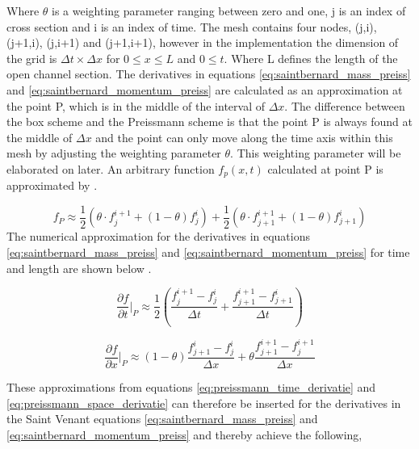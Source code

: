 Where $\theta$ is a weighting parameter ranging between zero and one, j is an index of cross section and i is an index of time. The mesh contains four nodes, (j,i), (j+1,i), (j,i+1) and (j+1,i+1), however in the implementation the dimension of the grid is $\Delta t \times \Delta x$ for $0 \leq x \leq L$ and $0\leq t$. Where L defines the length of the open channel section. The derivatives in equations \ref{eq:saintbernard_mass_preiss} and \ref{eq:saintbernard_momentum_preiss} are calculated as an approximation at the point P, which is in the middle of the interval of $\Delta x$.%
The difference between the box scheme and the Preissmann scheme is that the point P is always found at the middle of $\Delta x$ and the point can only move along the time axis within this mesh by adjusting the weighting parameter $\theta$. This weighting parameter will be elaborated on later. An arbitrary function $f_p(x,t)$ calculated at point P is approximated by \cite{numerical_modeling}.

\begin{equation}\label{eq:approximated_function}
	f_P \approx \frac{1}{2} (\theta \cdot f_j^{i+1}+(1-\theta)f_j^i)+\frac{1}{2}(\theta\cdot f_{j+1}^{i+1}+(1-\theta)f_{j+1}^i)
\end{equation}
The numerical approximation for the derivatives in equations \ref{eq:saintbernard_mass_preiss} and \ref{eq:saintbernard_momentum_preiss} for time and length are shown below \cite{numerical_modeling}.

\begin{equation}\label{eq:preissmann_time_derivatie}
	\frac{\partial f}{\partial t}\bigg \rvert_P \approx \frac{1}{2}\left(\frac{f_j^{i+1}-f_j^i}{\Delta t}+\frac{f_{j+1}^{i+1}-f_{j+1}^i}{\Delta t}\right)
\end{equation}

\begin{equation}\label{eq:preissmann_space_derivatie}
	\frac{\partial f}{\partial x}\bigg \rvert_P \approx (1-\theta)\frac{f_{j+1}^i-f_{j}^i}{\Delta x}+\theta \frac{f_{j+1}^{i+1}-f_{j}^{i+1}}{\Delta x}
\end{equation}

These approximations from equations \ref{eq:preissmann_time_derivatie} and \ref{eq:preissmann_space_derivatie} can therefore be inserted for the derivatives in the Saint Venant equations \ref{eq:saintbernard_mass_preiss} and \ref{eq:saintbernard_momentum_preiss} and thereby achieve the following,


